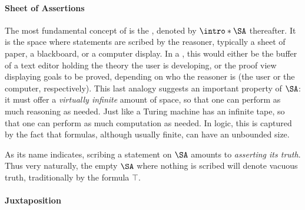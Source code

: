 \paragraph{Sheet of Assertions}

\AP
The most fundamental concept of  is the ,
denoted by $\intro*\SA$ thereafter. It is the space where statements are scribed
by the reasoner, typically a sheet of paper, a blackboard, or a computer
display. In a , this would either be the buffer of a text editor
holding the theory the user is developing, or the proof view displaying goals to
be proved, depending on who the reasoner is (the user or the computer,
respectively). This last analogy suggests an important property of $\SA$: it
must offer a \emph{virtually infinite} amount of space, so that one can perform
as much reasoning as needed. Just like a Turing machine has an infinite tape, so
that one can perform as much computation as needed. In  logic, this is
captured by the fact that formulas, although usually finite, can have an
unbounded size.

As its name indicates, scribing a statement on $\SA$ amounts to \emph{asserting
its truth}. Thus very naturally, the empty $\SA$ where nothing is scribed will
denote vacuous truth, traditionally  by the formula $\top$.


\paragraph{Juxtaposition}

